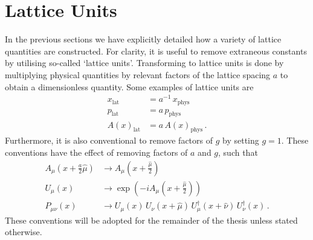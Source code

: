 \section{Lattice Units}

In the previous sections we have explicitly detailed how a variety of lattice quantities are constructed. For clarity, it is useful to remove extraneous constants by utilising so-called `lattice units'. Transforming to lattice units is done by multiplying physical quantities by relevant factors of the lattice spacing $a$ to obtain a dimensionless quantity. Some examples of lattice units are
%
\begin{align*}
x_\text{lat} &= a^{-1}\,x_\text{phys}\\
p_\text{lat} &= a\, p_\text{phys}\\
A(x)_\text{lat} &= a\, A(x)_\text{phys}\, .
\end{align*}
%
Furthermore, it is also conventional to remove factors of $g$ by setting $g=1$. These conventions have the effect of removing factors of $a$ and $g$, such that
%
\begin{align*}
A_\mu \left( x+\frac{a}{2}\hat{\mu} \right)&\rightarrow A_\mu \left(x+\frac{\hat{\mu}}{2} \right)\\
U_\mu(x) &\rightarrow \exp\left( -i A_\mu \left(x+\frac{\hat{\mu}}{2}\right)\right)\\
P_{\mu\nu}(x) &\rightarrow U_\mu(x)\,U_\nu(x+\hat{\mu})\, U_\mu^\dag(x+\hat{\nu})\, U_\nu^\dag(x)\, .
\end{align*}
%
These conventions will be adopted for the remainder of the thesis unless stated otherwise. 

%
%
%
%
%
